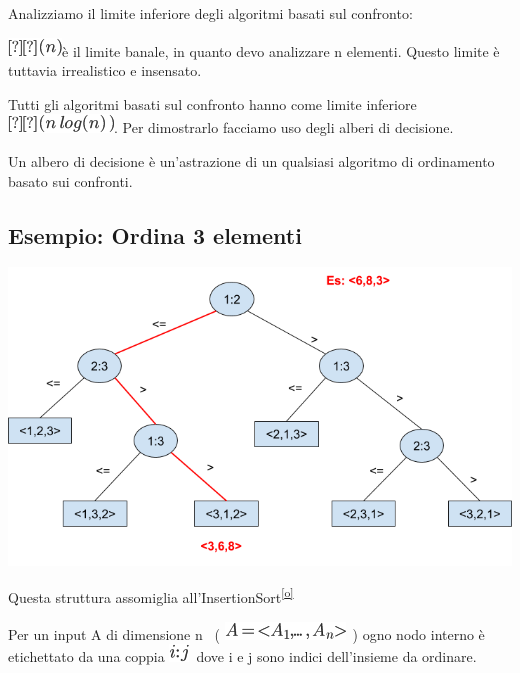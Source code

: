\documentclass{article}
\begin{document}
{}

{Analizziamo il limite inferiore degli algoritmi basati sul confronto:}

\includegraphics{images/image149.png}{è il limite banale, in quanto devo
analizzare n elementi. Questo limite è tuttavia irrealistico e
insensato.}

{}

{Tutti gli algoritmi basati sul confronto hanno come limite inferiore
}\includegraphics{images/image153.png}{. Per dimostrarlo facciamo uso
degli }{alberi di decisione.}

{}

{Un albero di decisione è un'astrazione di un qualsiasi algoritmo di
ordinamento basato sui confronti.}

\hypertarget{h.oynrnvh2y1cp}{\subsection{\texorpdfstring{{Esempio:
Ordina 3 elementi}}{Esempio: Ordina 3 elementi}}\label{h.oynrnvh2y1cp}}

{}

{\includegraphics{images/image531.png}}

{Questa struttura assomiglia
all'InsertionSort}\textsuperscript{\protect\hyperlink{cmnt15}{{[}o{]}}}

{}

{Per un input A di dimensione n ~(
}\includegraphics{images/image154.png}{~) ogno nodo interno è
etichettato da una coppia }\includegraphics{images/image155.png}{~}{dove
i e j sono indici dell'insieme da ordinare.}
\end{document}
